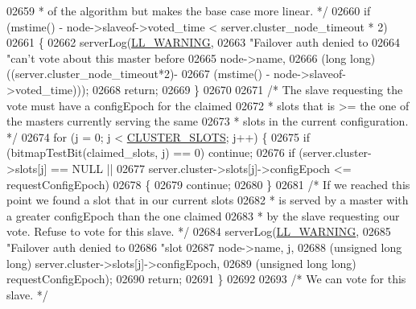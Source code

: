 \begin{DoxyCode}
{{{{{{{{{{{{{{{{{{{{{{{{{{{{{{{{{{{{{{{{{{{{{02659 \textcolor{comment}{     * of the algorithm but makes the base case more linear. */}
02660     \textcolor{keywordflow}{if} (mstime() - node->slaveof->voted\_time < server.cluster\_node\_timeout * 2)
02661     \{
02662         serverLog(\hyperlink{server_8h_a31229b9334bba7d6be2a72970967a14b}{LL\_WARNING},
02663                 \textcolor{stringliteral}{"Failover auth denied to %
02664                 \textcolor{stringliteral}{"can't vote about this master before %
02665                 node->name,
02666                 (\textcolor{keywordtype}{long} \textcolor{keywordtype}{long}) ((server.cluster\_node\_timeout*2)-
02667                              (mstime() - node->slaveof->voted\_time)));
02668         \textcolor{keywordflow}{return};
02669     \}
02670 
02671     \textcolor{comment}{/* The slave requesting the vote must have a configEpoch for the claimed}
02672 \textcolor{comment}{     * slots that is >= the one of the masters currently serving the same}
02673 \textcolor{comment}{     * slots in the current configuration. */}
02674     \textcolor{keywordflow}{for} (j = 0; j < \hyperlink{cluster_8h_aa3e2cb951eebb16725ecc3f5beefd9fd}{CLUSTER\_SLOTS}; j++) \{
02675         \textcolor{keywordflow}{if} (bitmapTestBit(claimed\_slots, j) == 0) \textcolor{keywordflow}{continue};
02676         \textcolor{keywordflow}{if} (server.cluster->slots[j] == NULL ||
02677             server.cluster->slots[j]->configEpoch <= requestConfigEpoch)
02678         \{
02679             \textcolor{keywordflow}{continue};
02680         \}
02681         \textcolor{comment}{/* If we reached this point we found a slot that in our current slots}
02682 \textcolor{comment}{         * is served by a master with a greater configEpoch than the one claimed}
02683 \textcolor{comment}{         * by the slave requesting our vote. Refuse to vote for this slave. */}
02684         serverLog(\hyperlink{server_8h_a31229b9334bba7d6be2a72970967a14b}{LL\_WARNING},
02685                 \textcolor{stringliteral}{"Failover auth denied to %
02686                 \textcolor{stringliteral}{"slot %
02687                 node->name, j,
02688                 (\textcolor{keywordtype}{unsigned} \textcolor{keywordtype}{long} \textcolor{keywordtype}{long}) server.cluster->slots[j]->configEpoch,
02689                 (\textcolor{keywordtype}{unsigned} \textcolor{keywordtype}{long} \textcolor{keywordtype}{long}) requestConfigEpoch);
02690         \textcolor{keywordflow}{return};
02691     \}
02692 
02693     \textcolor{comment}{/* We can vote for this slave. */}
}}}}}}}}}}}}}}}}}}}}}}}}}}}}}}}}}}}}}}}}}}}}}}}}}
\end{DoxyCode}
